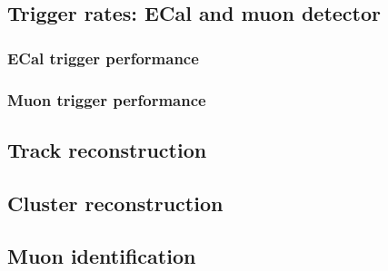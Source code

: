 \subsection{Trigger rates: ECal and muon detector}

\subsubsection{ECal trigger performance}




\subsubsection{Muon trigger performance}

\subsection{Track reconstruction}


\subsection{Cluster reconstruction}

\subsection{Muon identification}

